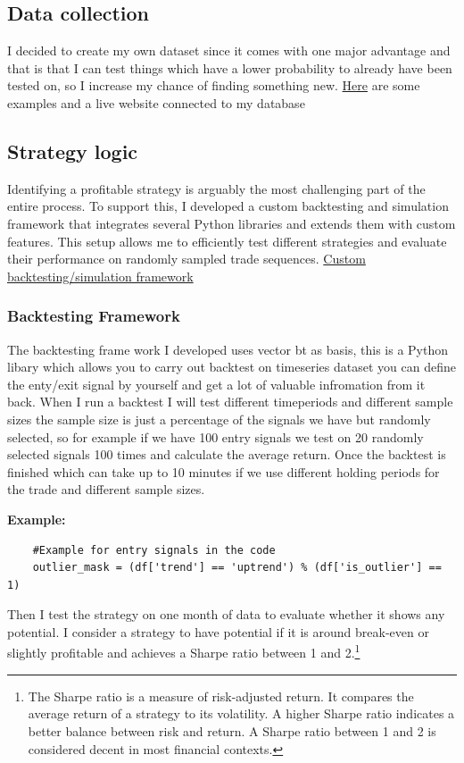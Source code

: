 \documentclass[12pt]{article}
\begin{document}
\subsection{Data collection}
I decided to create my own dataset since it comes with one major advantage and that is that I can test things which have a lower probability to already have been tested on, so I increase my chance of finding something new. \href{https://github.com/AJslashTracey/OBDeltaData}{Here} are some examples and a live website connected to my database


\subsection{Strategy logic}
Identifying a profitable strategy is arguably the most challenging part of the entire process. To support this, I developed a custom backtesting and simulation framework that integrates several Python libraries and extends them with custom features. This setup allows me to efficiently test different strategies and evaluate their performance on randomly sampled trade sequences. \href{https://github.com/AJslashTracey/signal_search_strategy}{Custom backtesting/simulation framework}


\subsubsection{Backtesting Framework}
The backtesting frame work I developed uses vector bt as basis, this is a Python libary which allows you to carry out backtest on timeseries dataset you can define the enty/exit signal by yourself and get a lot of valuable infromation from it back.
When I run a backtest I will test different timeperiods and different sample sizes the sample size is just a percentage of the signals we have but randomly selected, so for example if we have 100 entry signals we test on 20 randomly selected signals 100 times and calculate the average return.
Once the backtest is finished which can take up to 10 minutes if we use different holding periods for the trade and different sample sizes.

\textbf{Example:}

\begin{verbatim}
    #Example for entry signals in the code
    outlier_mask = (df['trend'] == 'uptrend') % (df['is_outlier'] == 1) 
\end{verbatim}

Then I test the strategy on one month of data to evaluate whether it shows any potential. I consider a strategy to have potential if it is around break-even or slightly profitable and achieves a Sharpe ratio between 1 and 2.\footnote{The Sharpe ratio is a measure of risk-adjusted return. It compares the average return of a strategy to its volatility. A higher Sharpe ratio indicates a better balance between risk and return. A Sharpe ratio between 1 and 2 is considered decent in most financial contexts.}
\end{document}
